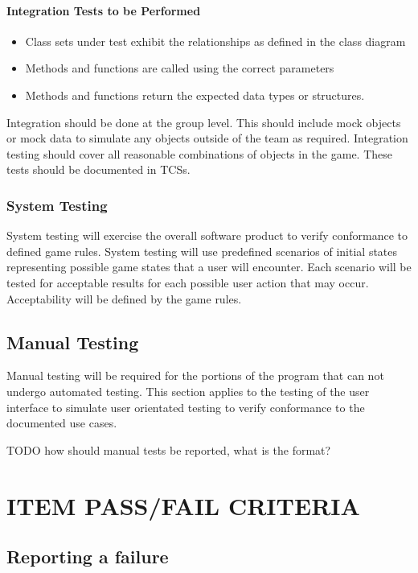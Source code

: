 \documentclass[report]{article}
\newcounter{rc}
\begin{document}
\paragraph{Integration Tests to be Performed}
\begin{itemize}
\item Class sets under test exhibit the relationships as defined in the class diagram
\item Methods and functions are called using the correct parameters
\item Methods and functions return the expected data types or structures.
\end{itemize}

Integration should be done at the group level. This should include mock objects or mock data to simulate any objects outside of the team as required. Integration testing should cover all reasonable combinations of objects in the game. These tests should be documented in TCSs.

\subsubsection{System Testing}
System testing will exercise the overall software product to verify conformance to defined game rules. System testing will use predefined scenarios of initial states representing possible game states that a user will encounter. Each scenario will be tested for acceptable results for each possible user action that may occur. Acceptability will be defined by the game rules. 

\subsection{Manual Testing}
Manual testing will be required for the portions of the program that can not undergo automated testing. This section applies to the testing of the user interface to simulate user orientated testing to verify conformance to the documented use cases.

TODO how should manual tests be reported, what is the format?

\section[ITEM PASS/FAIL CRITERIA]{ITEM PASS/FAIL CRITERIA}

\subsection{Reporting a failure}
\end{document}
